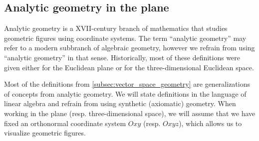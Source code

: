 \subsection{Analytic geometry in the plane}\label{subsec:analytic_geometry_in_the_plane}

\begin{remark}\label{remark:analytic_geometry}
  Analytic geometry is a XVII-century branch of mathematics that studies geometric figures using coordinate systems. The term \enquote{analytic geometry} may refer to a modern subbranch of algebraic geometry, however we refrain from using \enquote{analytic geometry} in that sense. Historically, most of these definitions were given either for the Euclidean plane or for the three-dimensional Euclidean space.

  Most of the definitions from \cref{subsec:vector_space_geometry} are generalizations of concepts from analytic geometry. We will state definitions in the language of linear algebra and refrain from using synthetic (axiomatic) geometry. When working in the plane (resp. three-dimensional space), we will assume that we have fixed an orthonormal coordinate system \( Oxy \) (resp. \( Oxyz \)), which allows us to visualize geometric figures.
\end{remark}

